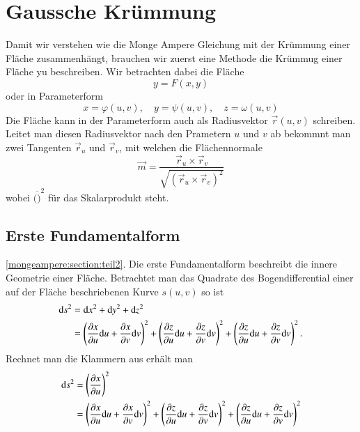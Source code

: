 %
%
%
%
\section{Gaussche Krümmung
\label{mongeampere:section:teil1}}
Damit wir verstehen wie die Monge Ampere Gleichung mit der 
Krümmung einer Fläche zusammenhängt, brauchen wir zuerst eine Methode die 
Krümmug einer Fläche yu beschreiben.
Wir betrachten dabei die Fläche
\begin{equation}
  y = F(x, y)
  \label{mongeampere:area}
\end{equation}
oder in Parameterform
\begin{equation}
  x = \varphi(u,v), \quad y = \psi(u,v), \quad z = \omega(u,v)
  \label{mongeampere:areaparam}
\end{equation}
Die Fläche kann in der Parameterform auch als Radiusvektor $\vec r (u, v)$
schreiben.
Leitet man diesen Radiusvektor nach den Prametern $u$ und $v$ ab bekommnt man zwei Tangenten
$\vec r_u$ und $\vec r_v$,
mit welchen die Flächennormale 
\begin{equation}
  \vec m = \frac{\vec r_u \times \vec r_v}{\sqrt{(\vec r_u \times \vec r_v)^2}} 
  \label{mongeampere:norm}
\end{equation}
wobei $(\dot)^2$ für das Skalarprodukt steht.



\subsection{Erste Fundamentalform
\label{mongeampere:subsection:finibus}}
\ref{mongeampere:section:teil2}.
Die erste Fundamentalform beschreibt die innere Geometrie einer Fläche.
Betrachtet man das Quadrate des Bogendifferential einer auf der Fläche 
beschriebenen Kurve $s(u,v)$ so ist 
\begin{equation}
  \begin{split}
    \dd s^2 &= \dd x^2 + \dd y^2 + \dd z^2 \\
          &= \left(\pdv{x}{u}\dd u + \pdv{x}{v}\dd v  \right)^2
          + \left(\pdv{z}{u}\dd u + \pdv{z}{v}\dd v  \right)^2
          + \left(\pdv{z}{u}\dd u + \pdv{z}{v}\dd v  \right)^2.
  \end{split}
  \label{mongeampere:bogdiff}
\end{equation}
Rechnet man die Klammern aus erhält man 
\begin{equation}
  \begin{split}
    \dd s^2 &=  \left(\pdv{x}{u}\right)^2\\
          &= \left(\pdv{x}{u}\dd u + \pdv{x}{v}\dd v  \right)^2
          + \left(\pdv{z}{u}\dd u + \pdv{z}{v}\dd v  \right)^2
          + \left(\pdv{z}{u}\dd u + \pdv{z}{v}\dd v  \right)^2
  \end{split}
  \label{mongeampere:bogdiff}
\end{equation}


